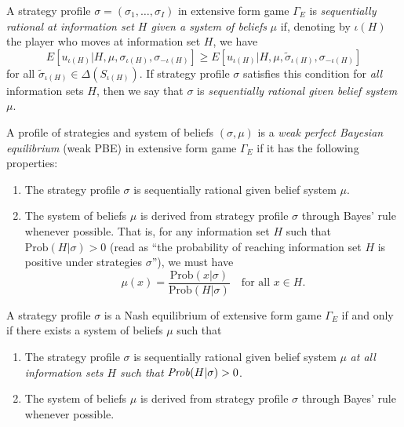 \begin{defn}
    A strategy profile $\sigma = (\sigma_1, \dots, \sigma_I)$ in extensive form game $\Gamma_E$ is \emph{sequentially rational at information set $H$ given a system of beliefs} $\mu$ if, denoting by $\iota(H)$ the player who moves at information set $H$, we have
    \begin{equation*}
        E[u_{\iota(H)} | H, \mu, \sigma_{\iota(H)}, \sigma_{-\iota(H)}] \geq E[u_{\iota(H)} | H, \mu, \tilde{\sigma}_{\iota(H)}, \sigma_{-\iota(H)}]
    \end{equation*}
    for all $\tilde{\sigma}_{\iota(H)} \in \Delta(S_{\iota(H)})$. If strategy profile $\sigma$ satisfies this condition for \emph{all} information sets $H$, then we say that $\sigma$ is \emph{sequentially rational given belief system} $\mu$.
\end{defn}

\begin{defn}
    A profile of strategies and system of beliefs $(\sigma, \mu)$ is a \emph{weak perfect Bayesian equilibrium} (weak PBE) in extensive form game $\Gamma_E$ if it has the following properties:
    \begin{enumerate}
        \item 
        The strategy profile $\sigma$ is sequentially rational given belief system $\mu$.
        
        \item 
        The system of beliefs $\mu$ is derived from strategy profile $\sigma$ through Bayes' rule whenever possible. That is, for any information set $H$ such that $\text{Prob}(H | \sigma) > 0$ (read as ``the probability of reaching information set $H$ is positive under strategies $\sigma$''), we must have
        \begin{equation*}
            \mu (x) = \frac{\text{Prob}(x | \sigma)}{\text{Prob}(H | \sigma)} \quad \text{for all } x \in H.
        \end{equation*}
    \end{enumerate}
\end{defn}

\begin{prop}
    A strategy profile $\sigma$ is a Nash equilibrium of extensive form game $\Gamma_E$ if and only if there exists a system of beliefs $\mu$ such that
    \begin{enumerate}
        \item The strategy profile $\sigma$ is sequentially rational given belief system $\mu$ \emph{at all information sets $H$ such that} $\text{\emph{Prob}}(H | \sigma) > 0$.
        \item The system of beliefs $\mu$ is derived from strategy profile $\sigma$ through Bayes' rule whenever possible.
    \end{enumerate}
\end{prop}

